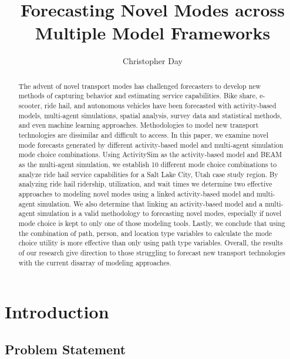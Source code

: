 \documentclass[12pt, oneside, openright]{byuthesis}
\title{Forecasting Novel Modes across\\
Multiple Model Frameworks}
\author{Christopher Day}
\begin{document}
\begin{abstract}
The advent of novel transport modes has challenged forecasters to develop new methods of capturing behavior and estimating service capabilities. Bike share, e-scooter, ride hail, and autonomous vehicles have been forecasted with activity-based models, multi-agent simulations, spatial analysis, survey data and statistical methods, and even machine learning approaches. Methodologies to model new transport technologies are dissimilar and difficult to access. In this paper, we examine novel mode forecasts generated by different activity-based model and multi-agent simulation mode choice combinations. Using ActivitySim as the activity-based model and BEAM as the multi-agent simulation, we establish 10 different mode choice combinations to analyze ride hail service capabilities for a Salt Lake City, Utah case study region. By analyzing ride hail ridership, utilization, and wait times we determine two effective approaches to modeling novel modes using a linked activity-based model and multi-agent simulation. We also determine that linking an activity-based model and a multi-agent simulation is a valid methodology to forecasting novel modes, especially if novel mode choice is kept to only one of those modeling tools. Lastly, we conclude that using the combination of path, person, and location type variables to calculate the mode choice utility is more effective than only using path type variables. Overall, the results of our research give direction to those struggling to forecast new transport technologies with the current disarray of modeling approaches.
\end{abstract}


\makefrontmatter %
\thesisbody

\hypertarget{introduction}{%
\chapter{Introduction}\label{introduction}}

\hypertarget{problem-statement}{%
\section{Problem Statement}\label{problem-statement}}
\end{document}
